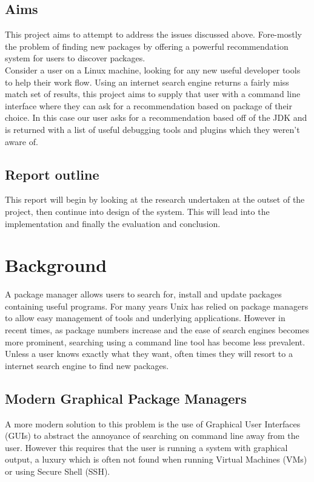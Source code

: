 \documentclass{l4proj}
\begin{document}
\section{Aims}
This project aims to attempt to address the issues discussed above. Fore-mostly the problem of finding new packages by offering a powerful recommendation system for users to discover packages.\\
Consider a user on a Linux machine, looking for any new useful developer tools to help their work flow. Using an internet search engine returns a fairly miss match set of results, this project aims to supply that user with a command line interface where they can ask for a recommendation based on package of their choice. In this case our user asks for a recommendation based off of the JDK and is returned with a list of useful debugging tools and plugins which they weren't aware of.

\section{Report outline}
This report will begin by looking at the research undertaken at the outset of the project, then continue into design of the system. This will lead into the implementation and finally the evaluation and conclusion.
 
 
\chapter{Background}
A package manager allows users to search for, install and update packages containing useful programs. For many years Unix has relied on package managers to allow easy management of tools and underlying applications. However in recent times, as package numbers increase and the ease of search engines becomes more prominent, searching using a command line tool has become less prevalent. Unless a user knows exactly what they want, often times they will resort to a internet search engine to find new packages.\\

\section{Modern Graphical Package Managers}
A more modern solution to this problem is the use of Graphical User Interfaces (GUIs) to abstract the annoyance of searching on command line away from the user. However this requires that the user is running a system with graphical output, a luxury which is often not found when running Virtual Machines (VMs) or using Secure Shell (SSH).\\
\end{document}
